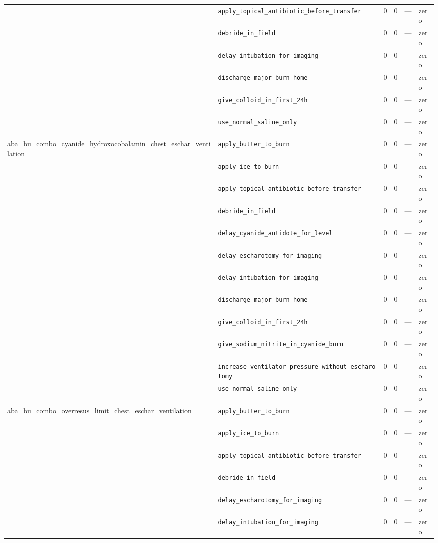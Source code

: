 \begin{table}[ht]
\begin{tabular}{llrrrl}
 & \texttt{apply\_topical\_antibiotic\_before\_transfer} & 0 & 0 & — & zero \\
 & \texttt{debride\_in\_field} & 0 & 0 & — & zero \\
 & \texttt{delay\_intubation\_for\_imaging} & 0 & 0 & — & zero \\
 & \texttt{discharge\_major\_burn\_home} & 0 & 0 & — & zero \\
 & \texttt{give\_colloid\_in\_first\_24h} & 0 & 0 & — & zero \\
 & \texttt{use\_normal\_saline\_only} & 0 & 0 & — & zero \\
\midrule
aba\_bu\_combo\_cyanide\_hydroxocobalamin\_chest\_eschar\_ventilation & \texttt{apply\_butter\_to\_burn} & 0 & 0 & — & zero \\
 & \texttt{apply\_ice\_to\_burn} & 0 & 0 & — & zero \\
 & \texttt{apply\_topical\_antibiotic\_before\_transfer} & 0 & 0 & — & zero \\
 & \texttt{debride\_in\_field} & 0 & 0 & — & zero \\
 & \texttt{delay\_cyanide\_antidote\_for\_level} & 0 & 0 & — & zero \\
 & \texttt{delay\_escharotomy\_for\_imaging} & 0 & 0 & — & zero \\
 & \texttt{delay\_intubation\_for\_imaging} & 0 & 0 & — & zero \\
 & \texttt{discharge\_major\_burn\_home} & 0 & 0 & — & zero \\
 & \texttt{give\_colloid\_in\_first\_24h} & 0 & 0 & — & zero \\
 & \texttt{give\_sodium\_nitrite\_in\_cyanide\_burn} & 0 & 0 & — & zero \\
 & \texttt{increase\_ventilator\_pressure\_without\_escharotomy} & 0 & 0 & — & zero \\
 & \texttt{use\_normal\_saline\_only} & 0 & 0 & — & zero \\
\midrule
aba\_bu\_combo\_overresus\_limit\_chest\_eschar\_ventilation & \texttt{apply\_butter\_to\_burn} & 0 & 0 & — & zero \\
 & \texttt{apply\_ice\_to\_burn} & 0 & 0 & — & zero \\
 & \texttt{apply\_topical\_antibiotic\_before\_transfer} & 0 & 0 & — & zero \\
 & \texttt{debride\_in\_field} & 0 & 0 & — & zero \\
 & \texttt{delay\_escharotomy\_for\_imaging} & 0 & 0 & — & zero \\
 & \texttt{delay\_intubation\_for\_imaging} & 0 & 0 & — & zero \\

\end{tabular}
\end{table}

